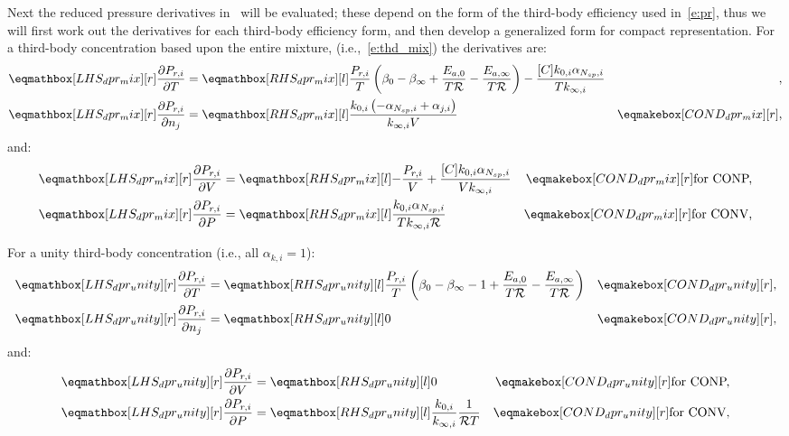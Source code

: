 \documentclass[12pt]{article}
\newcommand{\ns}{N_{sp}}
\newcommand{\conp}{CONP}
\newcommand{\conv}{CONV}
\newcommand{\dconp}{\ifmmode\text{for \conp,}\else for \conp,\fi}
\newcommand{\dconv}{\ifmmode\text{for \conv,}\else for \conv.\fi}
\newcommand{\Ru}{\mathcal{R}}
\begin{document}
Next the reduced pressure derivatives in~ will be evaluated; these depend on the form of the third-body efficiency used in~\cref{e:pr}, thus we will first work out the derivatives for each third-body efficiency form, and then develop a generalized form for compact representation.
For a third-body concentration based upon the entire mixture, (i.e.,~\cref{e:thd_mix}) the derivatives are:
\begin{align}
 \lhs{dpr_mix}{\frac{\partial P_{r, i} }{\partial T }} &= \rhs{dpr_mix}{\frac{P_{r, i}}{T} \left(\beta_{0} - \beta_{\infty} + \frac{E_{a, 0}}{T \Ru} - \frac{E_{a, \infty}}{T \Ru}\right) - \frac{[C] k_{0, i} \alpha_{\ns,i}}{T k_{\infty, i}}} & {,} \label{e:dpr_mix_dt} \\
 \lhs{dpr_mix}{\frac{\partial P_{r, i} }{\partial n_j }} &= \rhs{dpr_mix}{\frac{k_{0, i} \left(- \alpha_{\ns,i} + \alpha_{j,i}\right)}{k_{\infty, i} V}} & \cond{dpr_mix}{,} \label{e:dpr_mix_dnj}
\end{align}
and:
\begin{subequations}
 \label{e:dpr_mix_de}
 \begin{align}
  \lhs{dpr_mix}{\frac{\partial P_{r, i} }{\partial V }} &= \rhs{dpr_mix}{- \frac{P_{r, i}}{V} + \frac{[C] k_{0, i} \alpha_{\ns,i}}{V k_{\infty, i}}} & \cond{dpr_mix}{\dconp} \\
  \lhs{dpr_mix}{\frac{\partial P_{r, i} }{\partial P }} &= \rhs{dpr_mix}{\frac{k_{0, i} \alpha_{\ns,i}}{T k_{\infty, i} \Ru}} & \cond{dpr_mix}{\dconv}
 \end{align}
\end{subequations}

For a unity third-body concentration (i.e., all $\alpha_{k,i}=1$):
\begin{align}
 \lhs{dpr_unity}{\frac{\partial P_{r, i} }{\partial T }} &= \rhs{dpr_unity}{\frac{P_{r, i}}{T} \left(\beta_{0} - \beta_{\infty} - 1 + \frac{E_{a, 0}}{T \Ru} - \frac{E_{a, \infty}}{T \Ru}\right)} & \cond{dpr_unity}{,} \label{e:dpr_unity_dt} \\
 \lhs{dpr_unity}{\frac{\partial P_{r, i} }{\partial n_j }} &= \rhs{dpr_unity}{0} & \cond{dpr_unity}{,} \label{e:dpr_unity_dnj}
\end{align}
and:
\begin{subequations}
 \label{e:dpr_unity_de}
 \begin{align}
  \lhs{dpr_unity}{\frac{\partial P_{r, i} }{\partial V }} &= \rhs{dpr_unity}{0} & \cond{dpr_unity}{\dconp}\\
  \lhs{dpr_unity}{\frac{\partial P_{r, i} }{\partial P }} &= \rhs{dpr_unity}{\frac{k_{0, i}}{k_{\infty, i}} \frac{1}{\Ru T}} & \cond{dpr_unity}{\dconv}
 \end{align}
\end{subequations}
\end{document}
